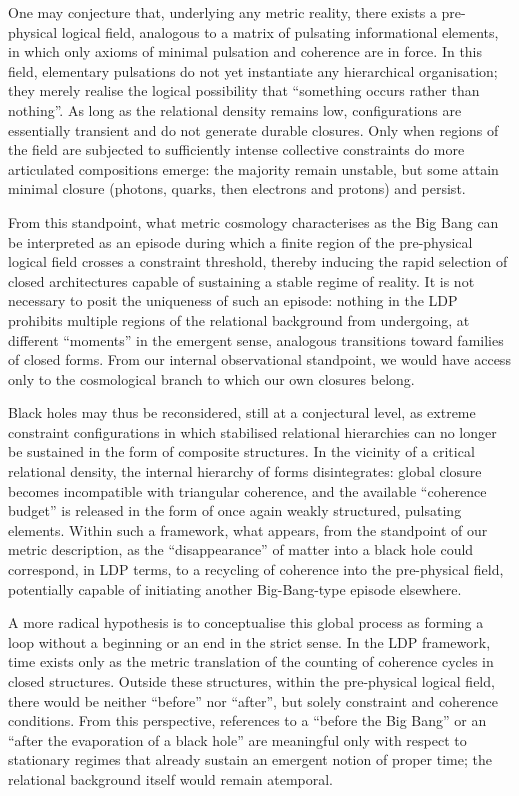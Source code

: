 \documentclass[11pt,a4paper]{article}
\begin{document}
One may conjecture that, underlying any metric reality, there exists a pre-physical logical field, analogous to a matrix of pulsating informational elements, in which only axioms of minimal pulsation and coherence are in force. In this field, elementary pulsations do not yet instantiate any hierarchical organisation; they merely realise the logical possibility that “something occurs rather than nothing”. As long as the relational density remains low, configurations are essentially transient and do not generate durable closures. Only when regions of the field are subjected to sufficiently intense collective constraints do more articulated compositions emerge: the majority remain unstable, but some attain minimal closure (photons, quarks, then electrons and protons) and persist. 

From this standpoint, what metric cosmology characterises as the Big Bang can be interpreted as an episode during which a finite region of the pre-physical logical field crosses a constraint threshold, thereby inducing the rapid selection of closed architectures capable of sustaining a stable regime of reality. It is not necessary to posit the uniqueness of such an episode: nothing in the LDP prohibits multiple regions of the relational background from undergoing, at different “moments” in the emergent sense, analogous transitions toward families of closed forms. From our internal observational standpoint, we would have access only to the cosmological branch to which our own closures belong.

Black holes may thus be reconsidered, still at a conjectural level, as extreme constraint configurations in which stabilised relational hierarchies can no longer be sustained in the form of composite structures. In the vicinity of a critical relational density, the internal hierarchy of forms disintegrates: global closure becomes incompatible with triangular coherence, and the available “coherence budget” is released in the form of once again weakly structured, pulsating elements. Within such a framework, what appears, from the standpoint of our metric description, as the “disappearance” of matter into a black hole could correspond, in LDP terms, to a recycling of coherence into the pre-physical field, potentially capable of initiating another Big-Bang-type episode elsewhere. 

A more radical hypothesis is to conceptualise this global process as forming a loop without a beginning or an end in the strict sense. In the LDP framework, time exists only as the metric translation of the counting of coherence cycles in closed structures. Outside these structures, within the pre-physical logical field, there would be neither “before” nor “after”, but solely constraint and coherence conditions. From this perspective, references to a “before the Big Bang” or an “after the evaporation of a black hole” are meaningful only with respect to stationary regimes that already sustain an emergent notion of proper time; the relational background itself would remain atemporal. 
\end{document}
